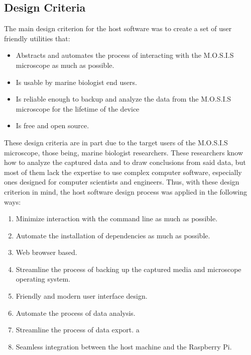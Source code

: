 \documentclass[12pt]{article}
\begin{document}
\subsection{Design Criteria}
The main design criterion for the host software was to create a set of user friendly utilities that:
\begin{itemize}
	\item Abstracts and automates the process of interacting with the M.O.S.I.S microscope as much as possible.
	\item Is usable by marine biologist end users.
	\item Is reliable enough to backup and analyze the data from the M.O.S.I.S microscope for the lifetime of the device
	\item Is free and open source.
\end{itemize}
These design criteria are in part due to the target users of the M.O.S.I.S microscope, those being, marine biologist researchers. These researchers know how to analyze the captured data and to draw conclusions from said data, but most of them lack the expertise to use complex computer software, especially ones designed for computer scientists and engineers. Thus, with these design criterion in mind, the host software design process was applied in the following ways:
\begin{enumerate}
	\item Minimize interaction with the command line as much as possible.
	\item Automate the installation of dependencies as much as possible.
	\item Web browser based.
	\item Streamline the process of backing up the captured media and microscope operating system.
	\item Friendly and modern user interface design.
	\item Automate the process of data analysis.
	\item Streamline the process of data export.
a	\item Seamless integration between the host machine and the Raspberry Pi.
\end{enumerate}
\end{document}
